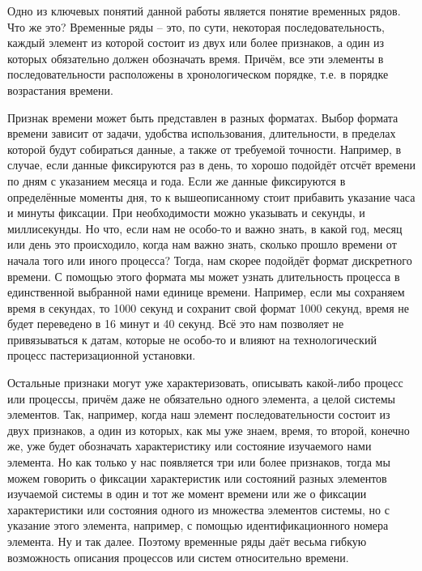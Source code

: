 {\cyrillicfont %
\fontsize{13pt}{16.25pt}\selectfont %
\englishfont %

  \par \redline Одно из ключевых понятий данной работы является понятие временных рядов. Что же это? Временные ряды – это, по сути, некоторая последовательность, каждый элемент из которой состоит из двух или более признаков, а один из которых обязательно должен обозначать время. Причём, все эти элементы в последовательности расположены в хронологическом порядке, т.е. в порядке возрастания времени. 

  \par \redline Признак времени может быть представлен в разных форматах. Выбор формата времени зависит от задачи, удобства использования, длительности, в пределах которой будут собираться данные, а также от требуемой точности. Например, в случае, если данные фиксируются раз в день, то хорошо подойдёт отсчёт времени по дням с указанием месяца и года. Если же данные фиксируются в определённые моменты дня, то к вышеописанному стоит прибавить указание часа и минуты фиксации. При необходимости можно указывать и секунды, и миллисекунды. Но что, если нам не особо-то и важно знать, в какой год, месяц или день это происходило, когда нам важно знать, сколько прошло времени от начала того или иного процесса? Тогда, нам скорее подойдёт формат дискретного времени. С помощью этого формата мы может узнать длительность процесса в единственной выбранной нами единице времени. Например, если мы сохраняем время в секундах, то 1000 секунд и сохранит свой формат 1000 секунд, время не будет переведено в 16 минут и 40 секунд. Всё это нам позволяет не привязываться к датам, которые не особо-то и влияют на технологический процесс пастеризационной установки.

  \par \redline Остальные признаки могут уже характеризовать, описывать какой-либо процесс или процессы, причём даже не обязательно одного элемента, а целой системы элементов. Так, например, когда наш элемент последовательности состоит из двух признаков, а один из которых, как мы уже знаем, время, то второй, конечно же, уже будет обозначать характеристику или состояние изучаемого нами элемента. Но как только у нас появляется три или более признаков, тогда мы можем говорить о фиксации характеристик или состояний разных элементов изучаемой системы в один и тот же момент времени или же о фиксации характеристики или состояния одного из множества элементов системы, но с указание этого элемента, например, с помощью идентификационного номера элемента. Ну и так далее. Поэтому временные ряды даёт весьма гибкую возможность описания процессов или систем относительно времени. 

}
